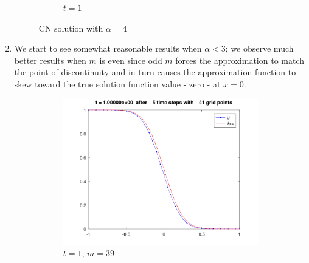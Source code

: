 \begin{solution}
\begin{enumerate}
\begin{figure}[h]
\begin{subfigure}[b]{0.4\textwidth}
                      \caption{$t = 1$}
                  \end{subfigure}
                  \caption[]{CN solution with $\alpha=4$}
              \end{figure}
              \pagebreak
        \item We start to see somewhat reasonable results when $\alpha < 3$; we observe much better results when $m$ is
              even since odd $m$ forces the approximation to match the point of discontinuity and in turn causes the
              approximation function to skew toward the true solution function value - zero - at $x = 0$.
              \ \\
              
              \begin{figure}[h]
                  \centering
                  \begin{subfigure}[b]{0.4\textwidth}
                      \centering
                      \includegraphics[width=\textwidth]{problem_3aii_m-39_heatCN_t-5.png}
                      \caption{$t = 1$, $m = 39$}
                  \end{subfigure}
                  \hfill
                  \begin{subfigure}[b]{0.4\textwidth}
                      \centering

\end{subfigure}
\end{figure}
\end{enumerate}
\end{solution}
